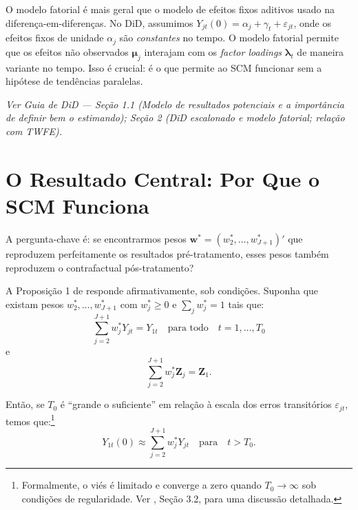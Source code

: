 \documentclass[12pt, a4paper, openany]{book}
\begin{document}
\begin{notabox}
O modelo fatorial é mais geral que o modelo de efeitos fixos aditivos usado na diferença-em-diferenças. No DiD, assumimos $Y_{jt}(0) = \alpha_j + \gamma_t + \varepsilon_{jt}$, onde os efeitos fixos de unidade $\alpha_j$ são \textit{constantes} no tempo. O modelo fatorial permite que os efeitos não observados $\boldsymbol{\mu}_j$ interajam com os \textit{factor loadings} $\boldsymbol{\lambda}_t$ de maneira variante no tempo. Isso é crucial: é o que permite ao SCM funcionar sem a hipótese de tendências paralelas.
\end{notabox}

\begin{conexaobox}
\textit{Ver Guia de DiD --- Seção 1.1 (Modelo de resultados potenciais e a importância de definir bem o estimando); Seção 2 (DiD escalonado e modelo fatorial; relação com TWFE).}
\end{conexaobox}


\section{O Resultado Central: Por Que o SCM Funciona}

A pergunta-chave é: se encontrarmos pesos $\mathbf{w}^* = (w_2^*, \ldots, w_{J+1}^*)'$ que reproduzem perfeitamente os resultados pré-tratamento, esses pesos também reproduzem o contrafactual pós-tratamento?

A Proposição 1 de \cite{AbadieDiamondHainmueller2010} responde afirmativamente, sob condições. Suponha que existam pesos $w_2^*, \ldots, w_{J+1}^*$ com $w_j^* \geq 0$ e $\sum_j w_j^* = 1$ tais que:
\begin{equation}
  \sum_{j=2}^{J+1} w_j^* Y_{jt} = Y_{1t} \quad \text{para todo} \quad t = 1, \ldots, T_0
  \label{eq:perfect_fit}
\end{equation}
e
\begin{equation}
  \sum_{j=2}^{J+1} w_j^* \mathbf{Z}_j = \mathbf{Z}_1.
  \label{eq:cov_balance}
\end{equation}

Então, se $T_0$ é ``grande o suficiente'' em relação à escala dos erros transitórios $\varepsilon_{jt}$, temos que:\footnote{Formalmente, o viés é limitado e converge a zero quando $T_0 \to \infty$ sob condições de regularidade. Ver \cite{Abadie2021}, Seção 3.2, para uma discussão detalhada.}
\begin{equation}
  Y_{1t}(0) \approx \sum_{j=2}^{J+1} w_j^* Y_{jt} \quad \text{para} \quad t > T_0.
\end{equation}
\end{document}
